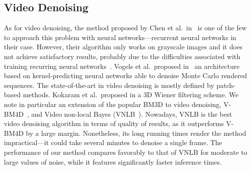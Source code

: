 \documentclass{article}
\begin{document}
	\subsection{Video Denoising}
	\label{sec:video-denoising}
	
	As for video denoising, the method proposed by Chen et al.\ in~\cite{chen2016deep} is one of the few to approach this problem with neural networks---recurrent neural networks in their case. However, their algorithm only works on grayscale images and it does not achieve satisfactory results, probably due to the difficulties associated with training recurring neural networks~\cite{pascanu2013difficulty}. Vogels et al.\ proposed in~\cite{vogels2018denoising} an architecture based on kernel-predicting neural networks able to denoise Monte Carlo rendered sequences. The state-of-the-art in video denoising is mostly defined by patch-based methods. Kokaram et al.\ proposed in \cite{kokaram1993motion} a 3D Wiener filtering scheme. We note in particular an extension of the popular BM3D to video denoising, V-BM4D~\cite{Maggioni2012}, and Video non-local Bayes (VNLB~\cite{Arias2018}). Nowadays, VNLB is the best video denoising algorithm in terms of quality of results, as it outperforms V-BM4D by a large margin. Nonetheless, its long running times render the method impractical---it could take several minutes to denoise a single frame. The performance of our method compares favorably to that of VNLB for moderate to large values of noise, while it features significantly faster inference times.
	
\end{document}

